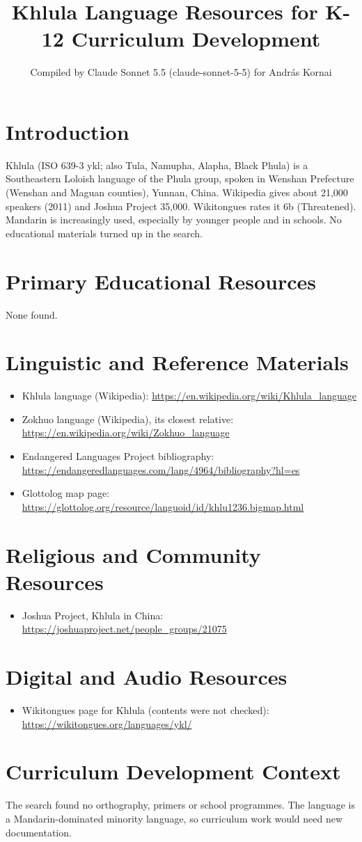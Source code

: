 \documentclass[12pt]{article}
\title{Khlula Language Resources for K-12 Curriculum Development}
\author{Compiled by Claude Sonnet 5.5 (claude-sonnet-5-5) for Andr\'as Kornai}
\date{}
\begin{document}
\maketitle

\section{Introduction}
Khlula (ISO 639-3 ykl; also Tula, Namupha, Alapha, Black Phula) is a Southeastern Loloish language of the Phula group, spoken in Wenshan Prefecture (Wenshan and Maguan counties), Yunnan, China. Wikipedia gives about 21,000 speakers (2011) and Joshua Project 35,000. Wikitongues rates it 6b (Threatened). Mandarin is increasingly used, especially by younger people and in schools. No educational materials turned up in the search.

\section{Primary Educational Resources}
None found.

\section{Linguistic and Reference Materials}
\begin{itemize}
\item Khlula language (Wikipedia): \url{https://en.wikipedia.org/wiki/Khlula_language}
\item Zokhuo language (Wikipedia), its closest relative: \url{https://en.wikipedia.org/wiki/Zokhuo_language}
\item Endangered Languages Project bibliography: \url{https://endangeredlanguages.com/lang/4964/bibliography?hl=es}
\item Glottolog map page: \url{https://glottolog.org/resource/languoid/id/khlu1236.bigmap.html}
\end{itemize}

\section{Religious and Community Resources}
\begin{itemize}
\item Joshua Project, Khlula in China: \url{https://joshuaproject.net/people_groups/21075}
\end{itemize}

\section{Digital and Audio Resources}
\begin{itemize}
\item Wikitongues page for Khlula (contents were not checked): \url{https://wikitongues.org/languages/ykl/}
\end{itemize}

\section{Curriculum Development Context}
The search found no orthography, primers or school programmes. The language is a Mandarin-dominated minority language, so curriculum work would need new documentation.
\end{document}
